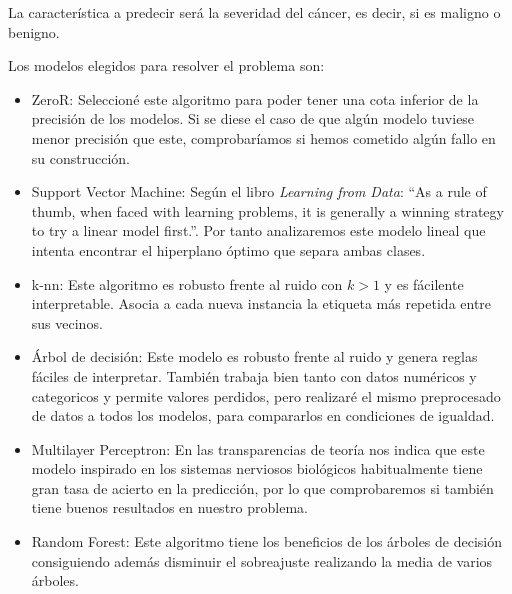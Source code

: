 \documentclass[a4]{article}
\begin{document}
\vspace{-5mm}
La característica a predecir será la severidad del cáncer, es decir, si es maligno o benigno.

Los modelos elegidos para resolver el problema son:

\begin{itemize}
\item ZeroR: Seleccioné este algoritmo para poder tener una cota inferior de la precisión de los modelos. Si se diese el caso de que algún modelo tuviese menor precisión que este, comprobaríamos si hemos cometido algún fallo en su construcción.
  
\item Support Vector Machine: Según el libro \textit{Learning from Data}: ``As a rule of thumb, when faced with learning problems, it is generally a winning strategy to try a linear model first.''. Por tanto analizaremos este modelo lineal que intenta encontrar el hiperplano óptimo que separa ambas clases.
  
\item k-nn: Este algoritmo es robusto frente al ruido con $k>1$ y es fácilente interpretable. Asocia a cada nueva instancia la etiqueta más repetida entre sus vecinos.
  
\item Árbol de decisión: Este modelo es robusto frente al ruido y genera reglas fáciles de interpretar. También trabaja bien tanto con datos numéricos y categoricos y permite valores perdidos, pero realizaré el mismo preprocesado de datos a todos los modelos, para compararlos en condiciones de igualdad.
  
\item Multilayer Perceptron: En las transparencias de teoría nos indica que este modelo inspirado en los sistemas nerviosos biológicos habitualmente tiene gran tasa de acierto en la predicción, por lo que comprobaremos si también tiene buenos resultados en nuestro problema.

\item Random Forest: Este algoritmo tiene los beneficios de los árboles de decisión consiguiendo además disminuir el sobreajuste realizando la media de varios árboles.
\end{itemize}
\end{document}
